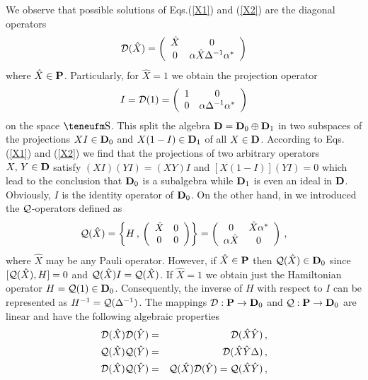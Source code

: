 \documentclass[a4paper,12pt]{article}
\begin{document}
We observe that  possible solutions of Eqs.(\ref{X1}) and (\ref{X2}) are 
the diagonal operators 
\begin{equation}
{\cal D}(\hat X)=\left(
\begin{array}{cc}
\hat X&0\\
0&\alpha\hat X\Delta^{-1}\alpha^{*}
\end{array}\right)
\end{equation}
where $\hat X\in {\bf P}$. Particularly, for $\hat X=1$ we obtain the 
projection operator 
\begin{equation}\label{id} 
I ={\cal D}(1)=\left(
\begin{array}{cc}
1&0\\
0&\alpha\Delta^{-1}\alpha^{*}
\end{array}\right)
\end{equation}
on the space $\Eh$. This split the algebra 
${\bf D}={\bf D}_{0}\oplus {\bf D}_{1}$ in two subspaces of the projections 
$XI\in {\bf D}_{0}$ and $X(1-I)\in {\bf D}_{1}$ of all $X\in {\bf D}$. 
According to Eqs.(\ref{X1}) and (\ref{X2}) we find that the projections of 
two arbitrary operators $X,\,Y\in {\bf D}$ satisfy  
$(XI)(YI)=(XY)I$ and $[X(1-I)](YI)=0$ which lead to the conclusion that    
${\bf D}_{0}$ is a subalgebra while ${\bf D}_{1}$ is even an ideal in  
${\bf D}$. Obviously, $I$ is the identity operator of ${\bf D}_{0}$. 
On the other hand, in \cite{CV2} we introduced  the ${\cal Q}$-operators 
defined as 
\begin{equation}
{\cal Q}(\hat X)=\left\{ H\,,\,\left(
\begin{array}{cc}
\hat X&0\\
0&0
\end{array} 
\right) \right\}
=\left(
\begin{array}{cc}
0&\hat X\alpha^*\\
\alpha\hat X&0
\end{array} 
\right)\,, 
\end{equation}
where $\hat X$ may be any Pauli operator. However, if $\hat 
X\in {\bf P}$ then ${\cal Q}(\hat X)\in {\bf D}_{0}$ since  
$[{\cal Q}(\hat X),H]=0$ and ${\cal Q}(\hat X)I= {\cal Q}(\hat X)$. 
If $\hat X=1$ we obtain just the Hamiltonian operator 
$H={\cal Q}(1)\in {\bf D}_0$. Consequently, the inverse of $H$ with respect 
to $I$ can be represented as $H^{-1}={\cal Q}(\Delta^{-1})$. 
The mappings ${\cal D} : {\bf P}\to {\bf D}_{0}$ and
${\cal Q} : {\bf P}\to {\bf D}_{0}$ are linear and have the following 
algebraic properties
\begin{eqnarray}
{\cal D}(\hat X){\cal D}(\hat Y)&=&{\cal D}(\hat X \hat Y)\,,\\
{\cal Q}(\hat X){\cal Q}(\hat Y)&=&{\cal D}(\hat X \hat Y\Delta)\,,\\
{\cal D}(\hat X){\cal Q}(\hat Y)&=&
{\cal Q}(\hat X){\cal D}(\hat Y)={\cal Q}(\hat X \hat Y)\,,
\end{eqnarray}
\end{document}
